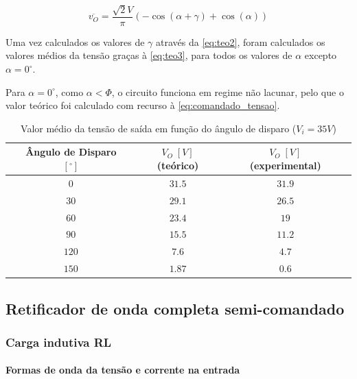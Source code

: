 \documentclass[a4paper,11pt]{article}
\numberwithin{equation}{section}
\begin{document}
\begin{equation}
\label{eq:teo4}
\overline{v_O} = \frac{\sqrt{2}V}{\pi} \left(-\cos{(\alpha + \gamma)}+\cos{(\alpha)}\right)
\end{equation}

Uma vez calculados os valores de $\gamma$ através da \autoref{eq:teo2}, foram calculados os valores médios da tensão graças à \autoref{eq:teo3}, para todos os valores de $\alpha$ excepto $\alpha = 0^\circ$.

Para $\alpha = 0^\circ$, como $\alpha < \Phi$, o circuito funciona em regime não lacunar, pelo que o valor teórico foi calculado com recurso à \autoref{eq:comandado_tensao}.

\begin{table}[H]
\centering
\begin{tabular}{c c c c c c c}
\hfil & Ângulo de Disparo $[^\circ]$ & \hfil & $V_O\;[V]$ (teórico) & \hfil & $V_O\;[V]$ (experimental) & \hfil \\
\hline
			&$0$&	&$31.5$&		&$31.9$&\\
\rowcolor{SkyBlue}	&$30$&	&$29.1$&		&$26.5$&\\
			&$60$&	&$23.4$&		&$19$&\\
\rowcolor{SkyBlue}	&$90$&	&$15.5$&		&$11.2$&\\
			&$120$&	&$7.6$&			&$4.7$&\\
\rowcolor{SkyBlue}	&$150$&	&$1.87$&		&$0.6$&\\
\hline
\end{tabular}
\caption{Valor médio da tensão de saída em função do ângulo de disparo ($V_i = 35 V$)}
\label{tab:akpklac}
\end{table}

\subsection{Retificador de onda completa semi-comandado}

\subsubsection{Carga indutiva RL}

\paragraph{Formas de onda da tensão e corrente na entrada} \mbox{}\
\end{document}
